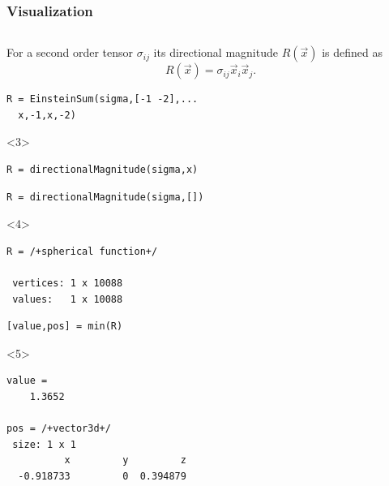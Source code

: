 \documentclass[compress]{beamer}
\begin{document}
\begin{frame}[fragile]
  \frametitle{Visualization}

  \begin{columns}
    \begin{column}{8.3cm}
      \begin{overlayarea}{\textwidth}{8cm}

      For a second order tensor $\sigma_{ij}$ its directional magnitude $R(\vec x)$
      is defined as
      \begin{equation*}
        R(\vec x) = \sigma_{ij} \vec x_{i} \vec x_{j}.
      \end{equation*}

\pause

\begin{lstlisting}[style=input]
R = EinsteinSum(sigma,[-1 -2],...
  x,-1,x,-2)
\end{lstlisting}

\pause

\begin{onlyenv}<3>
  \begin{lstlisting}[style=input]
R = directionalMagnitude(sigma,x)
\end{lstlisting}
\end{onlyenv}
\pause

\begin{lstlisting}[style=input]
R = directionalMagnitude(sigma,[])
\end{lstlisting}
\begin{onlyenv}<4>
  \vspace{-0.3cm}
  \begin{lstlisting}[style=output]
R = /+spherical function+/

 vertices: 1 x 10088
 values:   1 x 10088
  \end{lstlisting}
\end{onlyenv}

\pause

\begin{lstlisting}[style=input]
[value,pos] = min(R)
\end{lstlisting}
\begin{onlyenv}<5>
    \vspace{-0.3cm}
  \begin{lstlisting}[style=output]
value =
    1.3652

pos = /+vector3d+/
 size: 1 x 1
          x         y         z
  -0.918733         0  0.394879
  \end{lstlisting}
\end{onlyenv}



\end{overlayarea}
\end{column}
\end{columns}
\end{frame}
\end{document}
